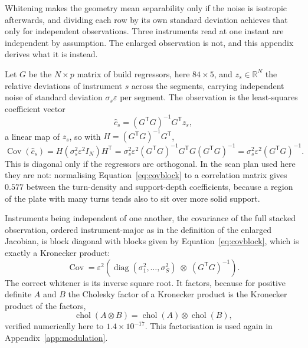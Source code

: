 \documentclass[preprint,12pt]{elsarticle}
\begin{document}
Whitening makes the geometry mean separability only if the noise is isotropic
afterwards, and dividing each row by its own standard deviation achieves that
only for independent observations. Three instruments read at one instant are
independent by assumption. The enlarged observation is not, and this appendix
derives what it is instead.

Let $G$ be the $N \times p$ matrix of build regressors, here $84 \times 5$, and
$z_s \in \mathbb{R}^N$ the relative deviations of instrument $s$ across the
segments, carrying independent noise of standard deviation
$\sigma_s \varepsilon$ per segment. The observation is the least-squares
coefficient vector
%
\begin{equation}
\hat c_s = (G^{\mathsf T} G)^{-1} G^{\mathsf T} z_s ,
\end{equation}
%
a linear map of $z_s$, so with $H = (G^{\mathsf T} G)^{-1} G^{\mathsf T}$,
%
\begin{equation}
\operatorname{Cov}(\hat c_s)
= H \left( \sigma_s^2 \varepsilon^2 I_N \right) H^{\mathsf T}
= \sigma_s^2 \varepsilon^2 (G^{\mathsf T} G)^{-1} G^{\mathsf T} G
  (G^{\mathsf T} G)^{-1}
= \sigma_s^2 \varepsilon^2 (G^{\mathsf T} G)^{-1} .
\label{eq:covblock}
\end{equation}
%
This is diagonal only if the regressors are orthogonal. In the scan plan used
here they are not: normalising Equation~\eqref{eq:covblock} to a correlation
matrix gives $0.577$ between the turn-density and support-depth coefficients,
because a region of the plate with many turns tends also to sit over more solid
support.

Instruments being independent of one another, the covariance of the full stacked
observation, ordered instrument-major as in the definition of the enlarged
Jacobian, is block diagonal with blocks given by
Equation~\eqref{eq:covblock}, which is exactly a Kronecker product:
%
\begin{equation}
\operatorname{Cov}
= \varepsilon^2 \left(
\operatorname{diag}(\sigma_1^2, \dots, \sigma_S^2)
\;\otimes\;
(G^{\mathsf T} G)^{-1}
\right).
\label{eq:kronapp}
\end{equation}
%
The correct whitener is its inverse square root. It factors, because for
positive definite $A$ and $B$ the Cholesky factor of a Kronecker product is the
Kronecker product of the factors,
%
\begin{equation}
\operatorname{chol}(A \otimes B)
= \operatorname{chol}(A) \otimes \operatorname{chol}(B) ,
\label{eq:cholkron}
\end{equation}
%
verified numerically here to $1.4\times10^{-17}$. This factorisation is used
again in Appendix~\ref{app:modulation}.
\end{document}
